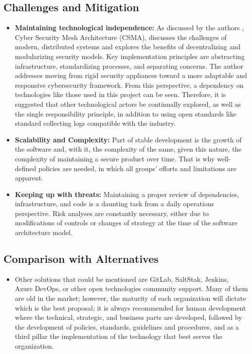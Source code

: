 \documentclass[conference]{IEEEtran}
\begin{document}
\subsection {Challenges and Mitigation}
\begin{itemize}
    \item \textbf{Maintaining technological independence:} As discussed by the authors \cite{SecurityInfoWatch2024}, Cyber Security Mesh Architecture (CSMA), discusses the challenges of modern, distributed systems and explores the benefits of decentralizing and modularizing security models. Key implementation principles are abstracting infrastructure, standardizing processes, and separating concerns. The author addresses moving from rigid security appliances toward a more adaptable and responsive cybersecurity framework. From this perspective, a dependency on technologies like those used in this project can be seen. Therefore, it is suggested that other technological actors be continually explored, as well as the single responsibility principle, in addition to using open standards like standard collecting logs compatible with the industry.    \item \textbf{Scalability and Complexity:} Part of stable development is the growth of the software and, with it, the complexity of the same, given this nature, the complexity of maintaining a secure product over time. That is why well-defined policies are needed, in which all groups' efforts and limitations are apparent.
    \item \textbf{Keeping up with threats:} Maintaining a proper review of dependencies, infrastructure, and code is a daunting task from a daily operations perspective. Risk analyses are constantly necessary, either due to modifications of controls or changes of strategy at the time of the software architecture model.
\end{itemize}

 \subsection{Comparison with Alternatives}
\begin{itemize}
    \item 
    Other solutions that could be mentioned are GitLab, SaltStak, Jenkins, Azure DevOps, or other open technologies community support. Many of them are old in the market; however, the maturity of each organization will dictate which is the best proposal; it is always recommended for human development where the technical, strategic, and business parts are developed, followed by the development of policies, standards, guidelines and procedures, and as a third pillar the implementation of the technology that best serves the organization.
\end{itemize}
\end{document}
